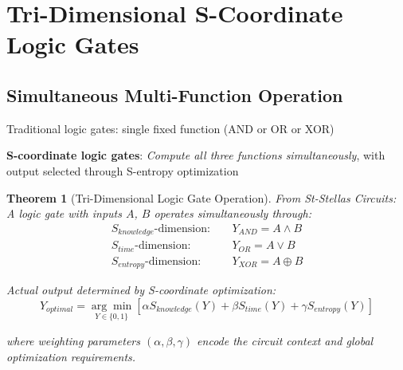 \documentclass[11pt,a4paper]{article}
\newtheorem{theorem}{Theorem}[section]
\begin{document}
\section{Tri-Dimensional S-Coordinate Logic Gates}

\subsection{Simultaneous Multi-Function Operation}

Traditional logic gates: single fixed function (AND or OR or XOR)

\textbf{S-coordinate logic gates}: \textit{Compute all three functions simultaneously}, with output selected through S-entropy optimization

\begin{theorem}[Tri-Dimensional Logic Gate Operation]
From St-Stellas Circuits\cite{stellas_circuits}: A logic gate with inputs $A$, $B$ operates simultaneously through:
\begin{align}
S_{knowledge}\text{-dimension}: \quad &Y_{AND} = A \land B \\
S_{time}\text{-dimension}: \quad &Y_{OR} = A \lor B \\
S_{entropy}\text{-dimension}: \quad &Y_{XOR} = A \oplus B
\end{align}

Actual output determined by S-coordinate optimization:
\begin{equation}
Y_{optimal} = \underset{Y \in \{0,1\}}{\arg\min} \left[ \alpha S_{knowledge}(Y) + \beta S_{time}(Y) + \gamma S_{entropy}(Y) \right]
\end{equation}

where weighting parameters $(\alpha, \beta, \gamma)$ encode the circuit context and global optimization requirements.
\end{theorem}
\end{document}
